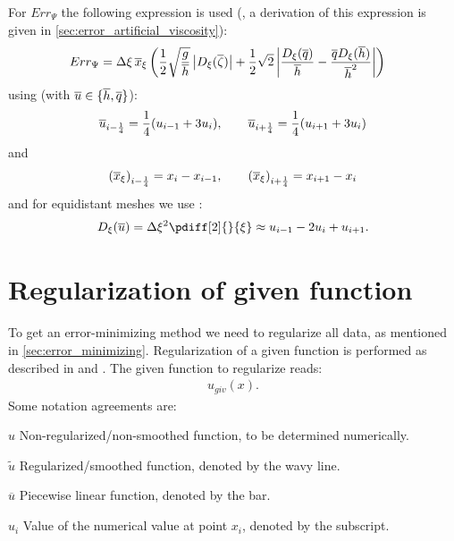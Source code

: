 For $Err_\Psi$ the following expression is used (\citet[eq.\ 42]{Borsboom2001}, a derivation of this expression is given in \autoref{sec:error_artificial_viscosity}):
\begin{align}
    &Err_\Psi = \Delta \xi\, \overline{x}_\xi \left( \frac{1}{2} \sqrt{\frac{g}{\overline{h}}} \left| D_\xi(\overline\zeta) \right| + 
    \frac{1}{2} \sqrt{2} \left| \frac{D_\xi(\overline{q})}{\overline{h}} - \frac{\overline{q} D_\xi(\overline{h})}{\overline{h}^2} \right| \right)
\end{align}
using (with $\overline{u} \in \{\overline{h}, \overline{q}\}$):
\begin{align}
    \overline{u}_{i-\frac{1}{4}} = \frac{1}{4}(u_{i-1} + 3 u_{i}), \qquad \overline{u}_{i+\frac{1}{4}} = \frac{1}{4}(u_{i+1} + 3 u_{i})
\end{align}
and
\begin{align}
    {(\overline{x}_{\xi})}_{i-\frac{1}{4}}= x_i - x_{i-1}, \qquad 
    {(\overline{x}_{\xi})}_{i+\frac{1}{4}}= x_{i+1} - x_{i}
\end{align}
and for equidistant meshes we use \citep[eq.\ 35]{Borsboom2001} :
\begin{align}
    D_\xi(\ubar) = \Dxi^2 \pdiff[2]{}{\xi} \approx u_{i-1} - 2 u_{i} + u_{i+1}.
\end{align}
\phantom{text}



\section{Regularization of given function}
To get an error-minimizing method we need to regularize all data, as mentioned in \autoref{sec:error_minimizing}.
Regularization of a given function is performed as described in \citet{Borsboom1998} and \citet{Borsboom2003}.
The given function to regularize reads:
\begin{align}
    u_{giv}(x).
\end{align}
Some notation agreements are:
\begin{symbollist}
    \item[$u$] Non-regularized/non-smoothed function, to be determined numerically.
    \item[$\widetilde u$] Regularized/smoothed function, denoted by the wavy line.
    \item[$\overline u$] Piecewise linear function, denoted by the bar.
    \item[$u_i$] Value of the numerical value at point $x_i$, denoted by the subscript.
\end{symbollist}

